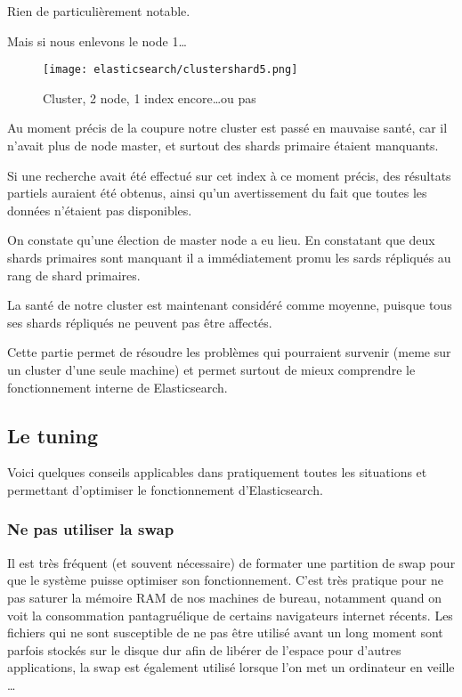 Rien de particulièrement notable.

Mais si nous enlevons le node 1\ldots

\begin{figure}[H]
\center
\texttt{[image: elasticsearch/clustershard5.png]}
\label{fig:clustershard5}
\caption{Cluster, 2 node, 1 index encore\ldots ou pas}
\end{figure}

Au moment précis de la coupure notre cluster est passé en mauvaise santé, car il 
n'avait plus de node master, et surtout des shards primaire étaient manquants.

Si une recherche avait été effectué sur cet index à ce moment précis, des résultats partiels
auraient été obtenus, ainsi qu'un avertissement du fait que toutes les données n'étaient
pas disponibles.

On constate qu'une élection de master node a eu lieu. En constatant que deux shards 
primaires sont manquant il a immédiatement promu les sards répliqués au rang de 
shard primaires.

La santé de notre cluster est maintenant considéré comme moyenne, puisque tous ses
shards répliqués ne peuvent pas être affectés.


Cette partie permet de résoudre les problèmes qui pourraient survenir (meme sur
un cluster d'une seule machine) et permet surtout de mieux comprendre le fonctionnement
interne de Elasticsearch.

\subsection{Le tuning}
Voici quelques conseils applicables dans pratiquement toutes les situations et 
permettant d'optimiser le fonctionnement d'Elasticsearch.

\subsubsection{Ne pas utiliser la swap}
Il est très fréquent (et souvent nécessaire) de formater une partition de swap pour
que le système puisse optimiser son fonctionnement. C'est très pratique pour ne pas
saturer la mémoire RAM de nos machines de bureau, notamment quand on voit la consommation
pantagruélique de certains navigateurs internet récents. Les fichiers qui ne sont 
susceptible de ne pas être utilisé avant un long moment sont parfois stockés sur le
disque dur afin de libérer de l'espace pour d'autres applications, la swap est
également utilisé lorsque l'on met un ordinateur en veille \ldots

